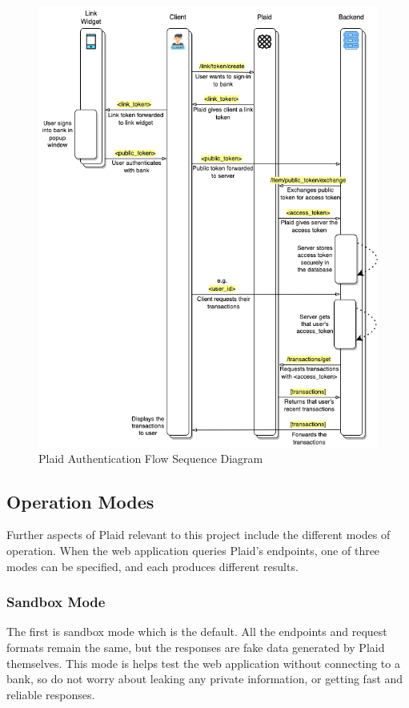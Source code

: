 \begin{figure}[H]
	\centering
    \includegraphics[width=\textwidth]{images/auth_flow_sequence_diagram.png}
    \caption{Plaid Authentication Flow Sequence Diagram}
    \label{fig:plaid_auth_flow}
\end{figure}

\subsection{Operation Modes}
Further aspects of Plaid relevant to this project include the different modes of operation. When the web application queries Plaid's endpoints, one of three modes can be specified, and each produces different results. 

\subsubsection{Sandbox Mode}
The first is sandbox mode which is the default. All the endpoints and request formats remain the same, but the responses are fake data generated by Plaid themselves. This mode is helps test the web application without connecting to a bank, so do not worry about leaking any private information, or getting fast and reliable responses. 

